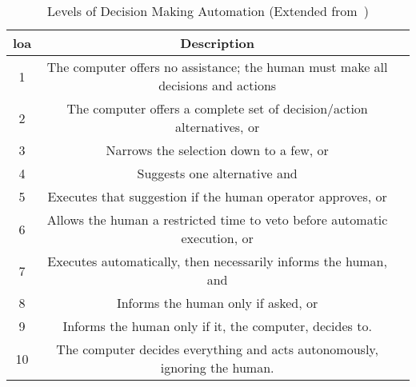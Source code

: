 \begin{comment}
Fox 64 citation wasn't good or relevant enough
\end{comment}

\begin{table}\centering
  \caption[Levels of Decision Making Automation]{Levels of Decision Making Automation (Extended from~\citet{Sheridan1978})}
  \label{tab:autonomy_levels_sheridan}
  \begin{tabularx}{\textwidth}{c c X}\toprule
    \gls{loa} & Description \\ \midrule
    1&    The computer offers no assistance; the human must make all decisions and actions\\
    2&    The computer offers a complete set of decision/action alternatives, or\\
    3&    Narrows the selection down to a few, or\\
    4&    Suggests one alternative and\\
    5&    Executes that suggestion if the human operator approves, or\\
    6&    Allows the human a restricted time to veto before automatic execution, or\\
    7&    Executes automatically, then necessarily informs the human, and\\
    8&    Informs the human only if asked, or\\
    9&    Informs the human only if it, the computer, decides to.\\
    10&   The computer decides everything and acts autonomously, ignoring the human.\\\bottomrule
  \end{tabularx}
\end{table}

